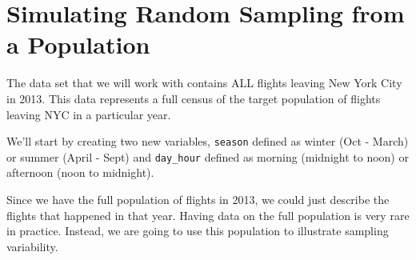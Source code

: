 \documentclass[]{book}
\newenvironment{Shaded}{\begin{snugshade}}{\end{snugshade}}
\newcommand{\DataTypeTok}[1]{\textcolor[rgb]{0.13,0.29,0.53}{#1}}
\newcommand{\DecValTok}[1]{\textcolor[rgb]{0.00,0.00,0.81}{#1}}
\newcommand{\KeywordTok}[1]{\textcolor[rgb]{0.13,0.29,0.53}{\textbf{#1}}}
\newcommand{\NormalTok}[1]{#1}
\newcommand{\OperatorTok}[1]{\textcolor[rgb]{0.81,0.36,0.00}{\textbf{#1}}}
\newcommand{\StringTok}[1]{\textcolor[rgb]{0.31,0.60,0.02}{#1}}
\begin{document}
\hypertarget{simulating-random-sampling-from-a-population}{%
\section{Simulating Random Sampling from a Population}\label{simulating-random-sampling-from-a-population}}

The data set that we will work with contains ALL flights leaving New York City in 2013. This data represents a full census of the target population of flights leaving NYC in a particular year.

We'll start by creating two new variables, \texttt{season} defined as winter (Oct - March) or summer (April - Sept) and \texttt{day\_hour} defined as morning (midnight to noon) or afternoon (noon to midnight).

\begin{Shaded}
\end{Shaded}

Since we have the full population of flights in 2013, we could just describe the flights that happened in that year. Having data on the full population is very rare in practice. Instead, we are going to use this population to illustrate sampling variability.
\end{document}
